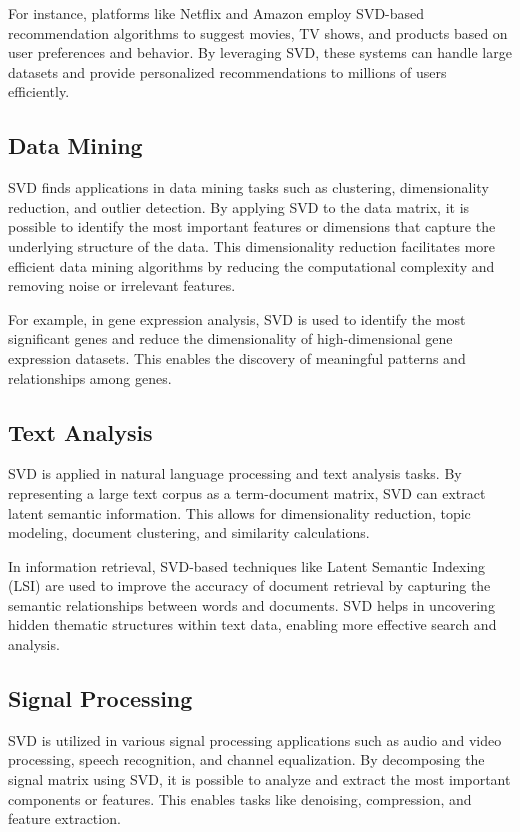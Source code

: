 \documentclass[a4paper]{article}
\begin{document}
{		For instance, platforms like Netflix and Amazon employ SVD-based recommendation algorithms to suggest movies, TV shows, and products based on user preferences and behavior. By leveraging SVD, these systems can handle large datasets and provide personalized recommendations to millions of users efficiently.
		
		\subsection{Data Mining}
		SVD finds applications in data mining tasks such as clustering, dimensionality reduction, and outlier detection. By applying SVD to the data matrix, it is possible to identify the most important features or dimensions that capture the underlying structure of the data. This dimensionality reduction facilitates more efficient data mining algorithms by reducing the computational complexity and removing noise or irrelevant features.
		
		For example, in gene expression analysis, SVD is used to identify the most significant genes and reduce the dimensionality of high-dimensional gene expression datasets. This enables the discovery of meaningful patterns and relationships among genes.
		
		\subsection{Text Analysis}
		SVD is applied in natural language processing and text analysis tasks. By representing a large text corpus as a term-document matrix, SVD can extract latent semantic information. This allows for dimensionality reduction, topic modeling, document clustering, and similarity calculations.
		
		In information retrieval, SVD-based techniques like Latent Semantic Indexing (LSI) are used to improve the accuracy of document retrieval by capturing the semantic relationships between words and documents. SVD helps in uncovering hidden thematic structures within text data, enabling more effective search and analysis.
		
		\subsection{Signal Processing}
		SVD is utilized in various signal processing applications such as audio and video processing, speech recognition, and channel equalization. By decomposing the signal matrix using SVD, it is possible to analyze and extract the most important components or features. This enables tasks like denoising, compression, and feature extraction.
		
}
\end{document}
